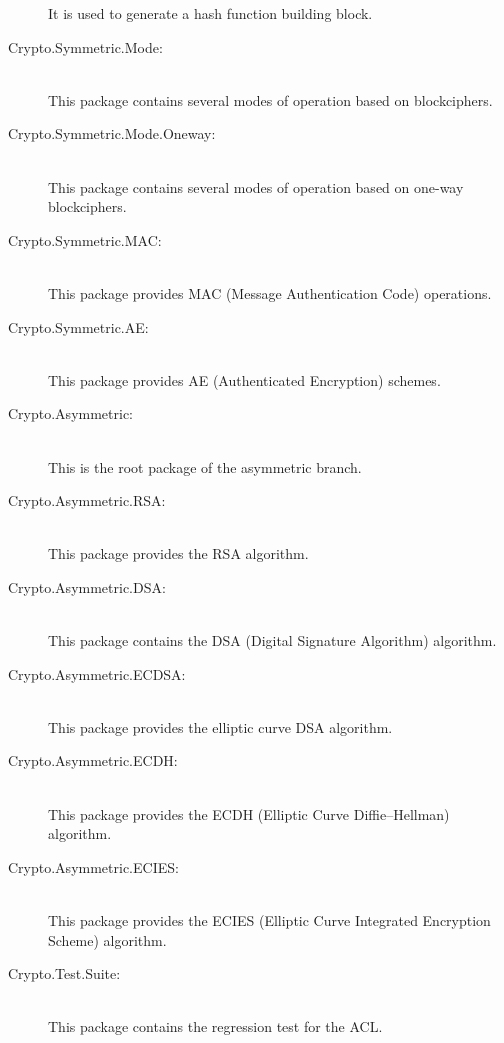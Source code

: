 \begin{description}
  It is used to generate a hash function building block.
\item[Crypto.Symmetric.Mode:]\ \\
  This package contains several modes of operation based on blockciphers.
\item[Crypto.Symmetric.Mode.Oneway:]\ \\
  This package contains several modes of operation based on one-way blockciphers.
\item[Crypto.Symmetric.MAC:] \ \\
  This package provides MAC (Message Authentication Code) operations.
\item[Crypto.Symmetric.AE:] \ \\
  This package provides AE (Authenticated Encryption) schemes.
\item[Crypto.Asymmetric:]\ \\
  This is the root package of the asymmetric branch.
\item[Crypto.Asymmetric.RSA:]\ \\
  This package provides the RSA algorithm.
\item[Crypto.Asymmetric.DSA:]\ \\
  This package contains the DSA (Digital Signature Algorithm) algorithm.
\item[Crypto.Asymmetric.ECDSA:]\ \\
  This package provides the elliptic curve DSA algorithm.
  \item[Crypto.Asymmetric.ECDH:]\ \\
  This package provides the ECDH (Elliptic Curve Diffie–Hellman) algorithm.
\item[Crypto.Asymmetric.ECIES:]\ \\
  This package provides the ECIES (Elliptic Curve Integrated Encryption Scheme) algorithm.
\item[Crypto.Test.Suite:]\ \\
  This package contains the regression test for the ACL.
\end{description}

